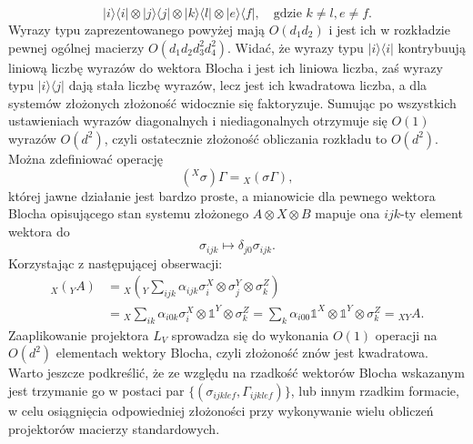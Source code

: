 \documentclass[10pt]{article} %
\newcommand{\Ket}[1]{|#1\rangle}
\newcommand{\Bra}[1]{\langle#1|}
\newcommand{\I}{\mathbb{1}}
\begin{document}
\begin{appendices}
\begin{equation}
\Ket{i}\Bra{i} \otimes \Ket{j}\Bra{j} \otimes \Ket{k}\Bra{l} \otimes \Ket{e}\Bra{f}, \quad \text{gdzie }k \neq l, e \neq f.
\end{equation} Wyrazy typu zaprezentowanego powyżej mają $O(d_1d_2)$ i jest ich w rozkładzie pewnej ogólnej macierzy $O(d_1d_2d_3^2d_4^2)$. Widać, że wyrazy typu $\Ket{i}\Bra{i}$ kontrybuują liniową liczbę wyrazów do wektora Blocha i jest ich liniowa liczba, zaś wyrazy typu $\Ket{i}\Bra{j}$ dają stała liczbę wyrazów, lecz jest ich kwadratowa liczba, a dla systemów złożonych złożoność widocznie się faktoryzuje. Sumując po wszystkich ustawieniach wyrazów diagonalnych i niediagonalnych otrzymuje się $O(1)$ wyrazów $O(d^2)$, czyli ostatecznie złożoność obliczania rozkładu to $O(d^2)$.
Można zdefiniować operację
\begin{equation}
({}^X\sigma) \Gamma = {}_X(\sigma\Gamma),
\end{equation} której jawne działanie jest bardzo proste, a mianowicie dla pewnego wektora Blocha opisującego stan systemu złożonego $A \otimes X \otimes B$ mapuje ona $ijk$-ty element wektora do
\begin{equation}
\sigma_{ijk} \mapsto \delta_{j0}\sigma_{ijk}.
\end{equation}
Korzystając z następującej obserwacji:
\begin{equation}
\begin{split}
{}_{X}({}_{Y}A) &= {}_{X}({}_{Y} \sum_{ijk} \alpha_{ijk} \sigma_i^X \otimes \sigma_j^Y\otimes \sigma_k^Z)\\ &= {}_X \sum_{ik} \alpha_{i0k} \sigma_i^X \otimes \I^Y \otimes \sigma_k^Z = \sum_k \alpha_{i00} \I^X\otimes \I^Y \otimes \sigma_k^Z = {}_{XY} A.
\end{split}
\end{equation} Zaaplikowanie projektora $L_V$ sprowadza się do wykonania $O(1)$ operacji na $O(d^2)$ elementach wektory Blocha, czyli złożoność znów jest kwadratowa.
Warto jeszcze podkreślić, że ze względu na rzadkość wektorów Blocha wskazanym jest trzymanie go w postaci par $\{ (\sigma_{ijklef}, \Gamma_{ijklef}) \}$, lub innym rzadkim formacie, w celu osiągnięcia odpowiedniej złożoności przy wykonywanie wielu obliczeń projektorów macierzy standardowych.

\end{appendices}
\end{document}
